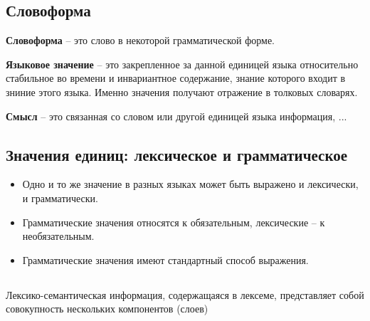 \documentclass{article}
\begin{document}
\subsection{Словоформа}
\textbf{Словоформа} -- это слово в некоторой грамматической форме.

\textbf{Языковое значение} -- это закрепленное за данной единицей языка
относительно стабильное во времени и инвариантное содержание, знание которого
входит в зниние этого языка. Именно значения получают отражение в толковых словарях.

\textbf{Смысл} -- это связанная со словом или другой единицей языка информация, ...

\subsection{Значения единиц: лексическое и грамматическое}

\begin{itemize}
    \item Одно и то же значение в разных языках может быть выражено и лексически, и грамматически.
    \item Грамматические значения относятся к обязательным, лексические -- к необязательным.
    \item Грамматические значения имеют стандартный способ выражения.
\end{itemize}

\subsection{}
Лексико-семантическая информация, содержащаяся в лексеме, представляет собой совокупность нескольких компонентов (слоев)
\end{document}
